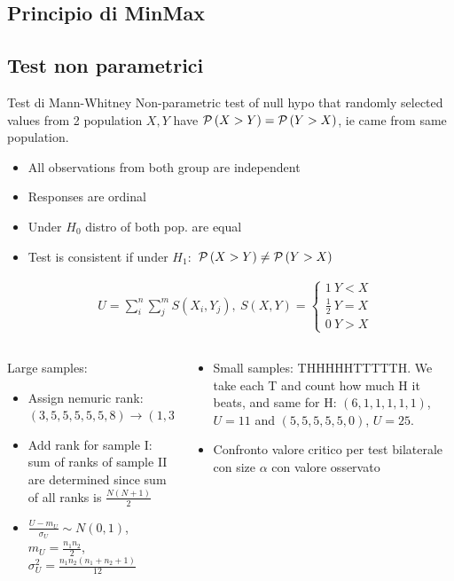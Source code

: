 \documentclass[asd-beamer.tex]{subfiles}%
\begin{document}
\subsection{Principio di MinMax}

\begin{frame}{}

\end{frame}
\subsection{Test non parametrici}

\begin{frame}{Test di Mann-Whitney}
    Non-parametric test of null hypo that randomly selected values from 2 population $X,Y$ have $\operatorname{\mathcal{P}}{(X>Y)}=\operatorname{\mathcal{P}}{(Y>X)}$, ie came from same population.
    \begin{itemize}
    \item All observations from both group are independent
    \item Responses are ordinal
    \item Under $H_0$ distro of both pop. are equal
    \item Test is consistent if under $H_1:$ $\operatorname{\mathcal{P}}{(X>Y)}\neq\operatorname{\mathcal{P}}{(Y>X)}$
    \end{itemize}
    \begin{align*}
        &U=\sum_i^n\sum_j^mS(X_i,Y_j),\ S(X,Y)=\left\{\begin{array}{l}
            1\ Y<X\\\frac{1}{2}\ Y=X\\0\ Y>X
        \end{array}\right.
     \end{align*}
    \begin{columns}[T]
        \begin{column}{0.55\textwidth}
            Large samples:
            \begin{itemize}
                \item Assign nemuric rank: $(3,5,5,5,5,5,8)\to(1,3.5,3.5,3.5,3.5,3.5,6)$
                \item Add rank for sample I: sum of ranks of sample II are determined since sum of all ranks is $\frac{N(N+1)}{2}$
                \item $\frac{U-m_U}{\sigma_U}\sim N(0,1)$, $m_U=\frac{n_1n_2}{2}$, $\sigma_U^2=\frac{n_1n_2(n_1+n_2+1)}{12}$
            \end{itemize}
        \end{column}
        \begin{column}{0.45\textwidth}
            \begin{itemize}
                \item Small samples: THHHHHTTTTTH. We take each T and count how much H it beats, and same for H: $(6,1,1,1,1,1)$, $U=11$ and $(5,5,5,5,5,0)$, $U=25$.
                \item Confronto valore critico per test bilaterale con size $\alpha$ con valore osservato
            \end{itemize}
        \end{column}
    \end{columns}
\end{frame}
 
\end{document}
